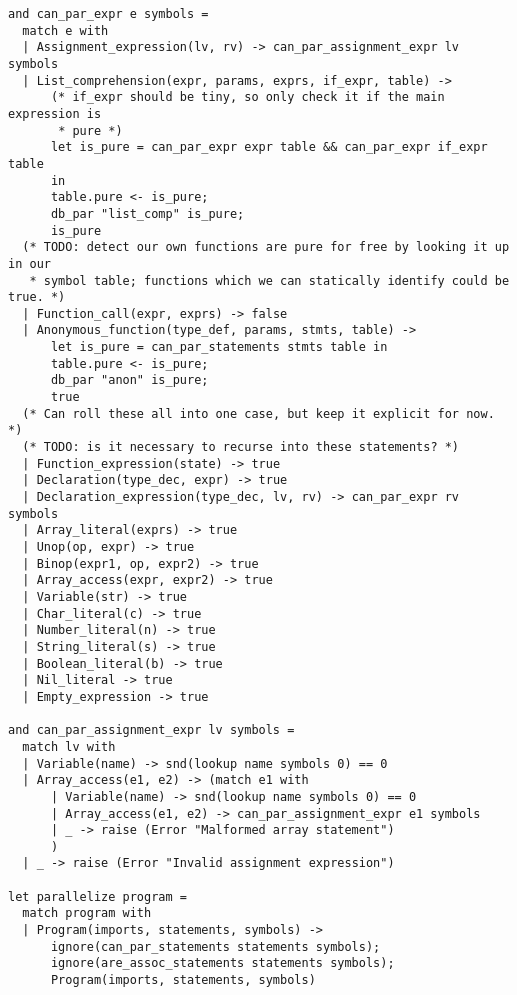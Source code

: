 \begin{verbatim}
and can_par_expr e symbols =
  match e with
  | Assignment_expression(lv, rv) -> can_par_assignment_expr lv symbols
  | List_comprehension(expr, params, exprs, if_expr, table) ->
      (* if_expr should be tiny, so only check it if the main expression is
       * pure *)
      let is_pure = can_par_expr expr table && can_par_expr if_expr table
      in
      table.pure <- is_pure;
      db_par "list_comp" is_pure;
      is_pure
  (* TODO: detect our own functions are pure for free by looking it up in our
   * symbol table; functions which we can statically identify could be true. *)
  | Function_call(expr, exprs) -> false
  | Anonymous_function(type_def, params, stmts, table) ->
      let is_pure = can_par_statements stmts table in
      table.pure <- is_pure;
      db_par "anon" is_pure;
      true
  (* Can roll these all into one case, but keep it explicit for now. *)
  (* TODO: is it necessary to recurse into these statements? *)
  | Function_expression(state) -> true
  | Declaration(type_dec, expr) -> true
  | Declaration_expression(type_dec, lv, rv) -> can_par_expr rv symbols
  | Array_literal(exprs) -> true
  | Unop(op, expr) -> true
  | Binop(expr1, op, expr2) -> true
  | Array_access(expr, expr2) -> true
  | Variable(str) -> true
  | Char_literal(c) -> true
  | Number_literal(n) -> true
  | String_literal(s) -> true
  | Boolean_literal(b) -> true
  | Nil_literal -> true
  | Empty_expression -> true

and can_par_assignment_expr lv symbols =
  match lv with
  | Variable(name) -> snd(lookup name symbols 0) == 0
  | Array_access(e1, e2) -> (match e1 with
      | Variable(name) -> snd(lookup name symbols 0) == 0
      | Array_access(e1, e2) -> can_par_assignment_expr e1 symbols
      | _ -> raise (Error "Malformed array statement")
      )
  | _ -> raise (Error "Invalid assignment expression")

let parallelize program =
  match program with
  | Program(imports, statements, symbols) ->
      ignore(can_par_statements statements symbols);
      ignore(are_assoc_statements statements symbols);
      Program(imports, statements, symbols)
\end{verbatim}
